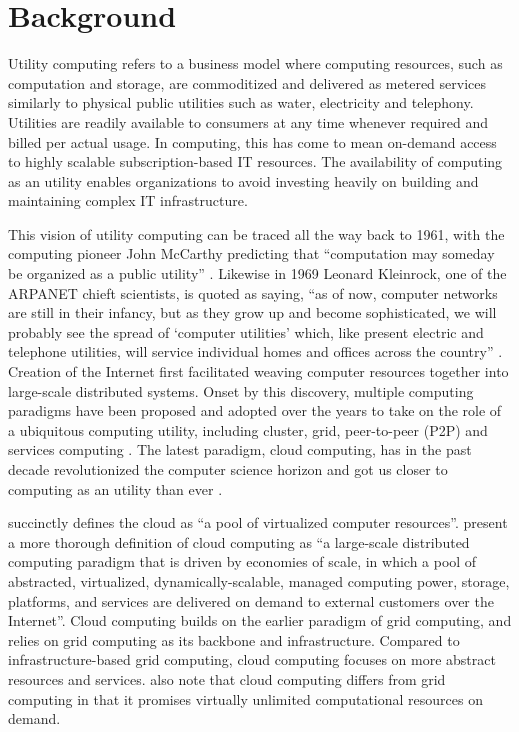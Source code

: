 \section{Background} \label{sec:background}

Utility computing refers to a business model where computing resources, such as computation and storage, are commoditized and delivered as metered services similarly to physical public utilities such as water, electricity and telephony. Utilities are readily available to consumers at any time whenever required and billed per actual usage. In computing, this has come to mean on-demand access to highly scalable subscription-based IT resources. The availability of computing as an utility enables organizations to avoid investing heavily on building and maintaining complex IT infrastructure. \parencite{buyya09cloud}

This vision of utility computing can be traced all the way back to 1961, with the computing pioneer John McCarthy predicting that ``computation may someday be organized as a public utility'' \parencite{foster08cloudGrid}. Likewise in 1969 Leonard Kleinrock, one of the ARPANET chieft scientists, is quoted as saying, ``as of now, computer networks are still in their infancy, but as they grow up and become sophisticated, we will probably see the spread of ‘computer utilities’ which, like present electric and telephone utilities, will service individual homes and offices across the country'' \parencite{kleinrock03internet}. Creation of the Internet first facilitated weaving computer resources together into large-scale distributed systems. Onset by this discovery, multiple computing paradigms have been proposed and adopted over the years to take on the role of a ubiquitous computing utility, including cluster, grid, peer-to-peer (P2P) and services computing \parencite{buyya09cloud}. The latest paradigm, cloud computing, has in the past decade revolutionized the computer science horizon and got us closer to computing as an utility than ever \parencite{buyya2017manifesto}.

\textcite{sareen13cloudTypes} succinctly defines the cloud as ``a pool of virtualized computer resources''. \textcite{foster08cloudGrid} present a more thorough definition of cloud computing as ``a large-scale distributed computing paradigm that is driven by economies of scale, in which a pool of abstracted, virtualized, dynamically-scalable, managed computing power, storage, platforms, and services are delivered on demand to external customers over the Internet''. Cloud computing builds on the earlier paradigm of grid computing, and relies on grid computing as its backbone and infrastructure. Compared to infrastructure-based grid computing, cloud computing focuses on more abstract resources and services. \textcite{buyya2017manifesto} also note that cloud computing differs from grid computing in that it promises virtually unlimited computational resources on demand.

